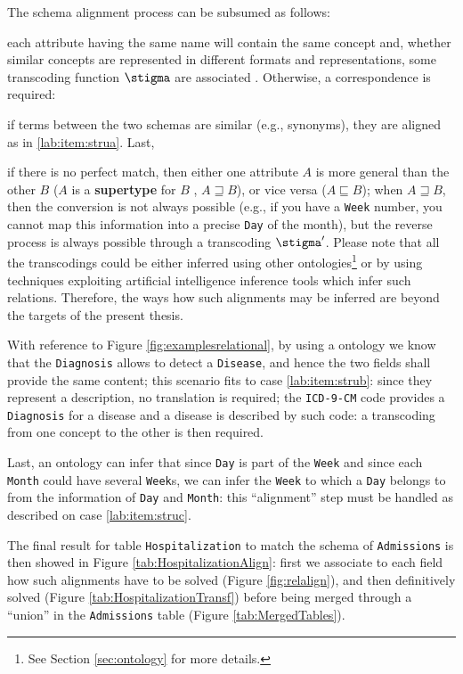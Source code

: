 The schema alignment process can be subsumed as follows:
\begin{alphalist}
	\item \label{lab:item:strua} each attribute having the same name will contain the same concept and, whether similar concepts are represented in different formats and representations, some transcoding function $\transcoding$ are associated \cite{GolfarelliMPRT12}. Otherwise, a correspondence is required:
	\item \label{lab:item:strub} if terms between the two schemas are similar (e.g., synonyms), they are aligned as in \ref{lab:item:strua}. Last, 
	\item \label{lab:item:struc} if there is no perfect match, then either one attribute $A$ is more general than the other $B$ ($A$ is a \textbf{supertype} for $B$  \cite{deII}, $A\sqsupseteq B$), or vice versa ($A\sqsubseteq B$); when $A\sqsupseteq B$, then the conversion is not always possible (e.g., if you have a \texttt{Week} number, you cannot map this information into a precise \texttt{Day} of the month), but the reverse process is always possible through a transcoding $\transcoding'$. Please note that all the transcodings could be either inferred using other ontologies\footnote{See Section \ref{sec:ontology} for more details.} or by using  techniques exploiting artificial intelligence inference tools which infer such relations. Therefore, the ways how such alignments may be inferred are beyond the targets of the present thesis.
\end{alphalist}

\begin{example}[continues=ex:firstThesis]
  With reference to Figure \ref{fig:examplesrelational}, by using a ontology we know that the \texttt{Diagnosis} allows to detect a \texttt{Disease}, and hence the two fields shall provide the same content; this scenario fits to case \vref{lab:item:strub}: since they represent a description, no translation is required; the \texttt{ICD-9-CM} code provides a \texttt{Diagnosis} for a disease and a disease is described by such code: a transcoding from one concept to the other is then required.

  Last, an ontology can infer that since \texttt{Day} is part of the \texttt{Week} and since each \texttt{Month} could have several \texttt{Week}s, we can infer the \texttt{Week} to which a \texttt{Day} belongs to from the information of \texttt{Day} and \texttt{Month}: this  ``alignment'' step must be handled as described on case \ref{lab:item:struc}.

  The final result for table \texttt{Hospitalization} to match the schema of \texttt{Admissions} is then showed in Figure \ref{tab:HospitalizationAlign}: first we associate to each field how such alignments have to be solved (Figure \vref{fig:relalign}), and then definitively solved (Figure \ref{tab:HospitalizationTransf}) before being merged through a ``union'' in the \texttt{Admissions} table (Figure \ref{tab:MergedTables}).
\end{example}




